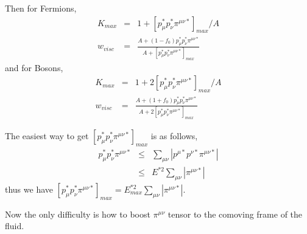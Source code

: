 \documentclass[11pt, oneside]{article}   	%
\begin{document}
Then for Fermions, 
\begin{eqnarray}
K_{max} &=& 1 + \left[ p_{\mu}^*p_{\nu}^*\pi^{\mu\nu*} \right]_{max}/A \\
w_{visc} &=& \frac{A + (1 - f_0)p_{\mu}^*p_{\nu}^*\pi^{\mu\nu*}}{A + \left[ p_{\mu}^*p_{\nu}^*\pi^{\mu\nu*} \right]_{max}}
\end{eqnarray}
and for Bosons,
\begin{eqnarray}
K_{max} &=& 1 + 2 \left[ p_{\mu}^*p_{\nu}^*\pi^{\mu\nu*} \right]_{max}/A \\
w_{visc} &=& \frac{A + (1 + f_0)p_{\mu}^*p_{\nu}^*\pi^{\mu\nu*}}{A + 2 \left[ p_{\mu}^*p_{\nu}^*\pi^{\mu\nu*} \right]_{max}}
\end{eqnarray}

The easiest way to get $\left[ p_{\mu}^*p_{\nu}^*\pi^{\mu\nu*} \right]_{max}$ is as follows,
\begin{eqnarray}
 p_{\mu}^*p_{\nu}^*\pi^{\mu\nu*}  & \le & \sum_{\mu \nu} | p^{\mu*} p^{\nu*} \pi^{\mu\nu*} |  \\
   & \le & E^{*2} \sum_{\mu \nu}  | \pi^{\mu\nu*} |  
\end{eqnarray}
thus we have $\left[ p_{\mu}^*p_{\nu}^*\pi^{\mu\nu*} \right]_{max} = E_{max}^{*2} \sum_{\mu \nu}  | \pi^{\mu\nu*}|$.

Now the only difficulty is how to boost $\pi^{\mu\nu}$ tensor to the comoving frame of the fluid.
\end{document}
